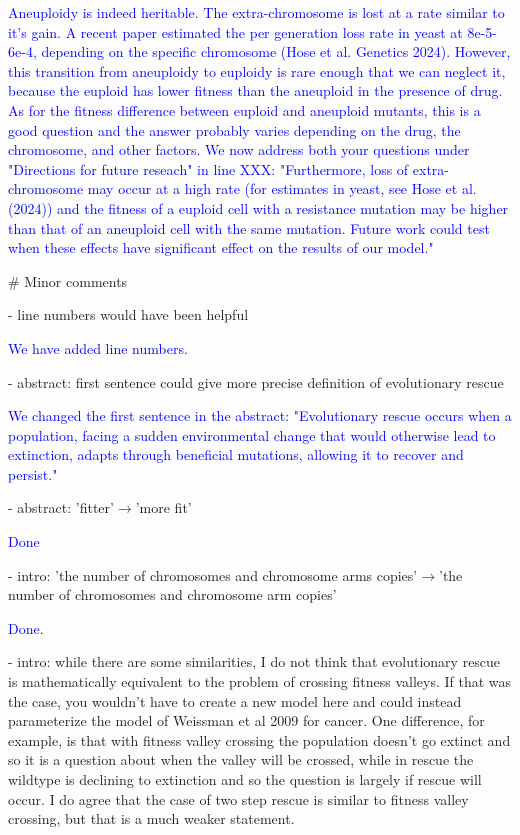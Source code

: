 \documentclass[12pt]{extarticle}
\begin{document}
\textcolor{blue}{%
Aneuploidy is indeed heritable. The extra-chromosome is lost at a rate similar to it's gain. A recent paper estimated the per generation loss rate in yeast at 8e-5-6e-4, depending on the specific chromosome (Hose et al. Genetics 2024). However, this transition from aneuploidy to euploidy is rare enough that we can neglect it, because the euploid has lower fitness than the aneuploid in the presence of drug.
As for the fitness difference between euploid and aneuploid mutants, this is a good question and the answer probably varies depending on the drug, the chromosome, and other factors. We now address both your questions under "Directions for future reseach" in line XXX: "Furthermore, loss of extra-chromosome may occur at a high rate (for estimates in yeast, see Hose et al. (2024)) and the fitness of a euploid cell with a resistance mutation may be higher than that of an aneuploid cell with the same mutation. Future work could test when these effects have significant effect on the results of our model." 
} 

$\#$ Minor comments

- line numbers would have been helpful

\textcolor{blue}{We have added line numbers.} 

- abstract: first sentence could give more precise definition of evolutionary rescue

\textcolor{blue}{%
We changed the first sentence in the abstract: "Evolutionary rescue occurs when a population, facing a sudden environmental change that would otherwise lead to extinction, adapts through beneficial mutations, allowing it to recover and persist."
} 

- abstract: 'fitter'$\rightarrow$'more fit'

\textcolor{blue}{Done} %

- intro: 'the number of chromosomes and chromosome arms copies'$\rightarrow$'the number of chromosomes and chromosome arm copies'

\textcolor{blue}{Done.}%

- intro: while there are some similarities, I do not think that evolutionary rescue is mathematically equivalent to the problem of crossing fitness valleys. If that was the case, you wouldn't have to create a new model here and could instead parameterize the model of Weissman et al 2009 for cancer. One difference, for example, is that with fitness valley crossing the population doesn't go extinct and so it is a question about when the valley will be crossed, while in rescue the wildtype is declining to extinction and so the question is largely if rescue will occur. I do agree that the case of two step rescue is similar to fitness valley crossing, but that is a much weaker statement.
\end{document}
